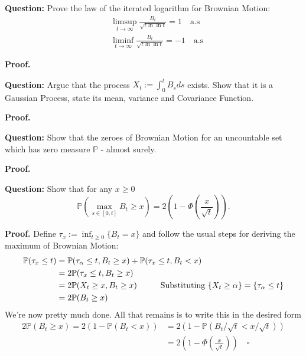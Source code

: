 \documentclass{article}
\begin{document}
\begin{tcolorbox}[colframe=black,colback=gray!5,boxrule=0.5pt]
\textbf{Question:} Prove the law of the iterated logarithm for Brownian Motion:
\begin{align*}
    & \limsup_{t\to\infty}\frac{B_t}{\sqrt{t\ln\ln t}}=1\quad \text{a.s} \\
    & \liminf_{t\to\infty}\frac{B_t}{\sqrt{t\ln\ln t}}=-1\quad \text{a.s}
\end{align*}
\end{tcolorbox}
\textbf{Proof.}

\begin{tcolorbox}[colframe=black,colback=gray!5,boxrule=0.5pt]
\textbf{Question:} Argue that the process $X_t := \int_0^t B_sds$ exists. Show that it is a Gaussian Process, state its mean, variance and Covariance Function.
\end{tcolorbox}
\textbf{Proof.}

\begin{tcolorbox}[colframe=black,colback=gray!5,boxrule=0.5pt]
\textbf{Question:} Show that the zeroes of Brownian Motion for an uncountable set which has zero measure $\mathbb{P}$ - almost surely.
\end{tcolorbox}
\textbf{Proof.}


\begin{tcolorbox}[colframe=black,colback=gray!5,boxrule=0.5pt]
\textbf{Question:} Show that for any $x\geq 0$ 
$$\mathbb{P}(\max_{s\in[0,t]} B_t\geq x) = 2\left(1- \Phi\left(\frac{x}{\sqrt{t}}\right)\right).$$
\end{tcolorbox}
\textbf{Proof.} Define $\tau_x := \inf_{t\geq0}\{B_t=x\}$ and follow the usual steps for deriving the maximum of Brownian Motion: 
\begin{align*}
    \mathbb{P}(\tau_x \leq t) &= \mathbb{P}(\tau_\alpha\leq t, B_t \geq x) + \mathbb{P}(\tau_x\leq t, B_t < x) \\
    &= 2\mathbb{P}(\tau_x\leq t, B_t \geq x) \\
    &= 2\mathbb{P}(X_t\geq x, B_t\geq x) \hspace{10mm}\text{{Substituting $\{X_t\geq\alpha\} = \{\tau_\alpha \leq t\}$}} \\
    &= 2\mathbb{P}(B_t\geq x) \\
\end{align*}
We're now pretty much done. All that remains is to write this in the desired form
\begin{align*}
    2\mathbb{P}(B_t\geq x) = 2(1 - \mathbb{P}(B_t <x))  &= 2(1 - \mathbb{P}(B_t/\sqrt{t} <x/\sqrt{t})) \\
    &= 2\left(1- \Phi\left(\frac{x}{\sqrt{t}}\right)\right) \quad\square
\end{align*}
\end{document}
